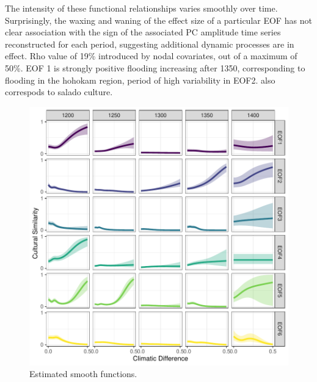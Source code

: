 \documentclass[10pt]{iopart}
\begin{document}
The intensity of these functional relationships varies smoothly over time. Surprisingly, the waxing and waning of the effect size of a particular EOF has not clear association with the sign of the associated PC amplitude time series reconstructed for each period, suggesting additional dynamic processes are in effect. Rho value of 19\% introduced by nodal covariates, out of a maximum of 50\%. EOF 1 is strongly positive flooding increasing after 1350, corresponding to flooding in the hohokam region, period of high variability in EOF2. also correspods to salado culture.

\begin{figure}[!htbp]
\centering
\includegraphics[width=.9\linewidth]{figures/smooths.pdf}
\caption{Estimated smooth functions.}
\label{fig:smooths}
\end{figure}



\end{document}
